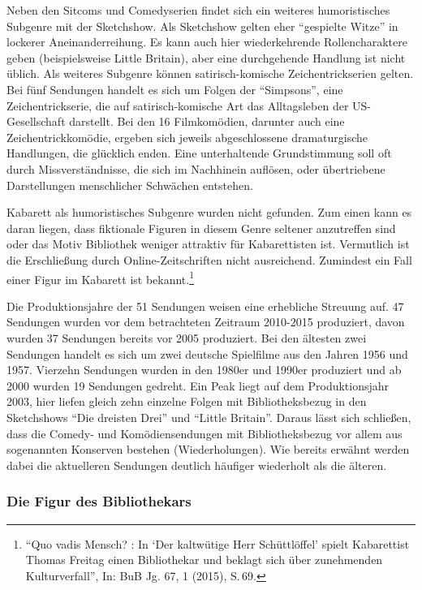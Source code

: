 Neben den Sitcoms und Comedyserien findet sich ein weiteres
humoristisches Subgenre mit der Sketchshow. Als Sketchshow gelten eher
\enquote{gespielte Witze} in lockerer Aneinanderreihung. Es kann auch
hier wiederkehrende Rollencharaktere geben (beispielsweise Little
Britain), aber eine durchgehende Handlung ist nicht üblich. Als weiteres
Subgenre können satirisch-komische Zeichentrickserien gelten. Bei fünf
Sendungen handelt es sich um Folgen der \enquote{Simpsons}, eine
Zeichentrickserie, die auf satirisch-komische Art das Alltagsleben der
US-Gesellschaft darstellt. Bei den 16 Filmkomödien, darunter auch eine
Zeichentrickkomödie, ergeben sich jeweils abgeschlossene dramaturgische
Handlungen, die glücklich enden. Eine unterhaltende Grundstimmung soll
oft durch Missverständnisse, die sich im Nachhinein auflösen, oder
übertriebene Darstellungen menschlicher Schwächen entstehen.

Kabarett als humoristisches Subgenre wurden nicht gefunden. Zum einen
kann es daran liegen, dass fiktionale Figuren in diesem Genre seltener
anzutreffen sind oder das Motiv Bibliothek weniger attraktiv für
Kabarettisten ist. Vermutlich ist die Erschließung durch
Online-Zeitschriften nicht ausreichend. Zumindest ein Fall einer Figur
im Kabarett ist bekannt.\footnote{\enquote{Quo vadis Mensch? : In
  \enquote{Der kaltwütige Herr Schüttlöffel} spielt Kabarettist Thomas
  Freitag einen Bibliothekar und beklagt sich über zunehmenden
  Kulturverfall}, In: BuB Jg. 67, 1 (2015), S.\,69.}

Die Produktionsjahre der 51 Sendungen weisen eine erhebliche Streuung
auf. 47 Sendungen wurden vor dem betrachteten Zeitraum 2010-2015
produziert, davon wurden 37 Sendungen bereits vor
2005 produziert. Bei den ältesten zwei Sendungen handelt es sich um zwei
deutsche Spielfilme aus den Jahren 1956 und 1957. Vierzehn Sendungen
wurden in den 1980er und 1990er produziert und ab 2000 wurden 19
Sendungen gedreht. Ein Peak liegt auf dem Produktionsjahr 2003, hier
liefen gleich zehn einzelne Folgen mit Bibliotheksbezug in den
Sketchshows \enquote{Die dreisten Drei} und \enquote{Little Britain}.
Daraus lässt sich schließen, dass die Comedy- und Komödiensendungen mit
Bibliotheksbezug vor allem aus sogenannten Konserven bestehen
(Wiederholungen). Wie bereits erwähnt werden dabei die aktuelleren
Sendungen deutlich häufiger wiederholt als die älteren.

\subsubsection{Die Figur des
Bibliothekars}\label{die-figur-des-bibliothekars}

